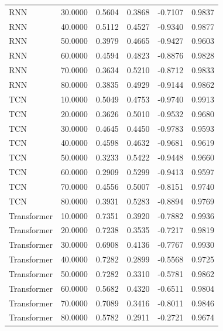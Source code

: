 \begin{tabular}{lrrrrr}
RNN & 30.0000 & 0.5604 & 0.3868 & -0.7107 & 0.9837 \\
RNN & 40.0000 & 0.5112 & 0.4527 & -0.9340 & 0.9877 \\
RNN & 50.0000 & 0.3979 & 0.4665 & -0.9427 & 0.9603 \\
RNN & 60.0000 & 0.4594 & 0.4823 & -0.8876 & 0.9828 \\
RNN & 70.0000 & 0.3634 & 0.5210 & -0.8712 & 0.9833 \\
RNN & 80.0000 & 0.3835 & 0.4929 & -0.9144 & 0.9862 \\
TCN & 10.0000 & 0.5049 & 0.4753 & -0.9740 & 0.9913 \\
TCN & 20.0000 & 0.3626 & 0.5010 & -0.9532 & 0.9680 \\
TCN & 30.0000 & 0.4645 & 0.4450 & -0.9783 & 0.9593 \\
TCN & 40.0000 & 0.4598 & 0.4632 & -0.9681 & 0.9619 \\
TCN & 50.0000 & 0.3233 & 0.5422 & -0.9448 & 0.9660 \\
TCN & 60.0000 & 0.2909 & 0.5299 & -0.9413 & 0.9597 \\
TCN & 70.0000 & 0.4556 & 0.5007 & -0.8151 & 0.9740 \\
TCN & 80.0000 & 0.3931 & 0.5283 & -0.8894 & 0.9769 \\
Transformer & 10.0000 & 0.7351 & 0.3920 & -0.7882 & 0.9936 \\
Transformer & 20.0000 & 0.7238 & 0.3535 & -0.7217 & 0.9819 \\
Transformer & 30.0000 & 0.6908 & 0.4136 & -0.7767 & 0.9930 \\
Transformer & 40.0000 & 0.7282 & 0.2899 & -0.5568 & 0.9725 \\
Transformer & 50.0000 & 0.7282 & 0.3310 & -0.5781 & 0.9862 \\
Transformer & 60.0000 & 0.5682 & 0.4320 & -0.6511 & 0.9804 \\
Transformer & 70.0000 & 0.7089 & 0.3416 & -0.8011 & 0.9846 \\
Transformer & 80.0000 & 0.5782 & 0.2911 & -0.2721 & 0.9674 \\
\bottomrule
\end{tabular}
